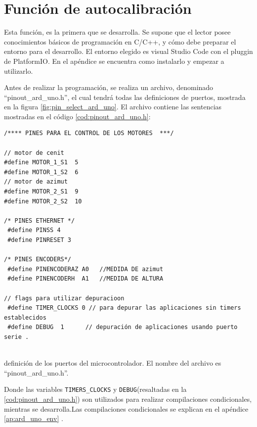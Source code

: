 



%
\section{Función de autocalibración}
Esta función, es la primera que se desarrolla. Se supone que el lector posee conocimientos básicos de programación en C/C++, y cómo debe preparar el entorno para el desarrollo. El entorno elegido es visual Studio Code con el pluggin de PlatformIO. En el apéndice se encuentra como instalarlo y empezar a utilizarlo. 

Antes de realizar la programación, se realiza un archivo, denominado ``pinout\_ard\_uno.h'', el cual tendrá todas las definiciones de puertos, mostrada en la figura \ref{fig:pin_select_ard_uno}. El archivo contiene las sentencias mostradas en el código \ref{cod:pinout_ard_uno.h}: 


\begin{listing}[ht]

	\begin{verbatim}
/**** PINES PARA EL CONTROL DE LOS MOTORES  ***/
		
// motor de cenit 
#define MOTOR_1_S1  5
#define MOTOR_1_S2  6
// motor de azimut 
#define MOTOR_2_S1  9 
#define MOTOR_2_S2  10 
		
/* PINES ETHERNET */
 #define PINSS 4
 #define PINRESET 3  
		
/* PINES ENCODERS*/
 #define PINENCODERAZ A0   //MEDIDA DE azimut 
 #define PINENCODERH  A1   //MEDIDA DE ALTURA 
		
// flags para utilizar depuracioon 
 #define TIMER_CLOCKS 0 // para depurar las aplicaciones sin timers establecidos  
 #define DEBUG  1      // depuración de aplicaciones usando puerto serie .  
		
\end{verbatim}
	\vspace{-5mm}
	\caption{definición de los puertos del microcontrolador. El nombre del archivo es ``pinout\_ard\_uno.h''.}
	\label{cod:pinout_ard_uno.h} 
\end{listing}
Donde las variables \texttt{TIMERS_CLOCKS} y \texttt{DEBUG}(resaltadas en la \ref{cod:pinout_ard_uno.h}) son utilizados para realizar compilaciones condicionales, mientras se desarrolla.Las compilaciones condicionales se explican en el apéndice \ref{ap:ard_uno_env} .
 
